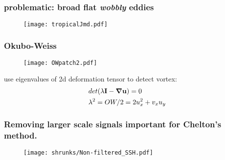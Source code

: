 \begin{frame}
\frametitle{problematic: broad flat \textit{wobbly} eddies}
 \begin{figure}
\centering
\texttt{[image: tropicalJmd.pdf]}
\end{figure}
\end{frame}

\begin{frame}
	\frametitle{Okubo-Weiss}
	\centering
	\begin{minipage}[T]{1\textwidth}
	\begin{figure}
		\texttt{[image: OWpatch2.pdf]}
	\end{figure}		
	\end{minipage}
\vfill
	\begin{minipage}[T]{1\textwidth}
		use eigenvalues of 2d deformation tensor to detect vortex: 
\begin{align*}
& det(\lambda\mathbf{\bm{I}}- \mathbf{\bm{\mathbf{\bm{\nabla}} \mathbf{\bm{u}}}}) =0\\
&\lambda^{2} =OW/2=2 u_{x}^{2} + v_{x}u_{y}
\end{align*}	
\end{minipage}
\end{frame}


\begin{frame}
\frametitle{Removing larger scale signals important for Chelton's method.}
\begin{figure}
	\centering
	\texttt{[image: shrunks/Non-filtered\_SSH.pdf]}
\end{figure}
\end{frame}

